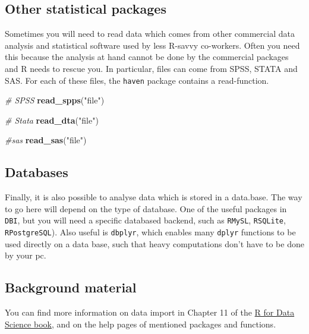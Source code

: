\documentclass[]{tufte-book}
\newenvironment{Shaded}{}{}
\newcommand{\CommentTok}[1]{\textcolor[rgb]{0.38,0.63,0.69}{\textit{#1}}}
\newcommand{\KeywordTok}[1]{\textcolor[rgb]{0.00,0.44,0.13}{\textbf{#1}}}
\newcommand{\NormalTok}[1]{#1}
\newcommand{\StringTok}[1]{\textcolor[rgb]{0.25,0.44,0.63}{#1}}
\begin{document}
\hypertarget{other-statistical-packages}{%
\subsection{Other statistical packages}\label{other-statistical-packages}}

Sometimes you will need to read data which comes from other commercial data analysis and statistical software used by less R-savvy co-workers. Often you need this because the analysis at hand cannot be done by the commercial packages and R needs to rescue you. In particular, files can come from SPSS, STATA and SAS. For each of these files, the \texttt{haven} package contains a read-function.

\begin{Shaded}
\begin{Highlighting}[]
\CommentTok{# SPSS}
\KeywordTok{read_spps}\NormalTok{(}\StringTok{"file"}\NormalTok{)}

\CommentTok{# Stata }
\KeywordTok{read_dta}\NormalTok{(}\StringTok{"file"}\NormalTok{)}

\CommentTok{#sas}
\KeywordTok{read_sas}\NormalTok{(}\StringTok{"file"}\NormalTok{)}
\end{Highlighting}
\end{Shaded}

\hypertarget{databases}{%
\subsection{Databases}\label{databases}}

Finally, it is also possible to analyse data which is stored in a data.base. The way to go here will depend on the type of database. One of the useful packages in \texttt{DBI}, but you will need a specific databased backend, such as \texttt{RMySL}, \texttt{RSQLite}, \texttt{RPostgreSQL}). Also useful is \texttt{dbplyr}, which enables many \texttt{dplyr} functions to be used directly on a data base, such that heavy computations don't have to be done by your pc.

\hypertarget{background-material-2}{%
\subsection{Background material}\label{background-material-2}}

You can find more information on data import in Chapter 11 of the \href{https://r4ds.had.co.nz/data-import.html}{R for Data Science book}, and on the help pages of mentioned packages and functions.
\end{document}

